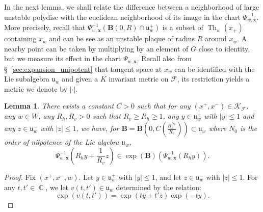 \documentclass[12pt]{amsbook}%
\newtheorem{lem}[thm]{Lemma}
\theoremstyle{definition}
\theoremstyle{remark}
\numberwithin{section}{chapter}
\numberwithin{subsection}{section}
\numberwithin{figure}{chapter}
\DeclareMathOperator{\C}{\mathbb{C}}
\DeclareMathOperator{\Th}{Th}
\DeclareMathOperator{\Opp}{Opp}
\def\dyl{>0}
\def\cF{{\mathscr{F}}}
\def\sK{{\mathscr{K}}}
\def\fu{{\mathfrak{u}}}
\def\fuwp{{\mathfrak{u}_w^+}}
\def\fuwm{{\mathfrak{u}_w^-}}
\def\xpair{{(x^+,x^-)}}
\def\bx{\mathbf{x}}
\def\kap{}
\begin{document}
{{In the next lemma, we shall relate the difference between a neighborhood of large unstable polydisc with the euclidean neighborhood of its image in the chart $\Psi_{w,\bx}^{-1}$. 
More precisely, recall that $\Psi_{w,\bx}^{-1} (\mathbf{B}(0,R) \cap \mathfrak{u}_w^{+})$ is a subset of $\Th_w(x_+)$ containing $x_w$ and can be see as an unstable plaque of radius $R$ around $x_w$. A nearby point can be taken by multiplying by an element of  $G$ close to identity, but we measure its effect in the chart $\Psi_{w,\bx}$.
Recall also from \S~\ref{sec:expansion_unipotent} that tangent space at $x_w$ can be identified with the Lie subalgebra $\mathfrak{u}_w$ and given a $K$ invariant metric on $\cF$, its restriction yields a metric we denote by $|\cdot |$. 
%
\begin{lem}\label{lem:vertical_BCH_estimate}
There exists a constant $C>0$ 
such that for any $\xpair\in \sK_\cF$, any $w\in W$, any $R_h,R_v\dyl$ such that $R_v\geqslant R_h\geqslant 1$, any $y\in \fuwp$ with $\vert y \vert \leqslant 1$ and any $z\in \fuwm$ with $\vert z\vert \leqslant 1$, we have, for $\mathbf{B}=\mathbf{B}\left(0,C\left(\frac{R_h^{N_0}}{R_v}\right)\right)\subset \fu_w$ where $N_0$ is the order of nilpotence of the Lie algebra $\fu_w$, 
\[
\Psi_{w,\bx}^{-1} \left (R_hy+\frac{1}{R_v}z \right )\in \exp\left(\mathbf{B}\right)\left(\Psi_{w,\bx}^{-1}(R_hy)\right).
\]
\end{lem}
\begin{proof}
Fix $(x^+,x^-,w)$. %
Let 
$y\in \fuwp$ with $\vert y \vert \leqslant 1$, and let $z\in \fuwm$ with $\vert z\vert \leqslant 1$.
For any $t,t'\in \C$, we let $v(t,t') \in \mathfrak{u}_w$ determined by the relation:
\begin{equation}\label{eq:BCH_formula0}
\exp(v(t,t'))=\exp(t y+ t' z)\exp (-t y).
\end{equation}


\end{proof}}}
\end{document}
